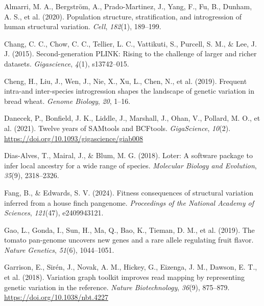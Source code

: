 \documentclass[
]{agujournal2019}
\newlength{\cslhangindent}
\newenvironment{CSLReferences}[2] %
 {\begin{list}{}{%
  \setlength{\itemindent}{0pt}
  \setlength{\leftmargin}{0pt}
  \setlength{\parsep}{0pt}
  \ifodd #1
   \setlength{\leftmargin}{\cslhangindent}
   \setlength{\itemindent}{-1\cslhangindent}
  \fi
  \setlength{\itemsep}{#2\baselineskip}}}
 {\end{list}}
\begin{document}
\label{refs}
\begin{CSLReferences}{1}{0}
\vspace{1em}

Almarri, M. A., Bergström, A., Prado-Martinez, J., Yang, F., Fu, B.,
Dunham, A. S., et al. (2020). Population structure, stratification, and
introgression of human structural variation. \emph{Cell}, \emph{182}(1),
189--199.

Chang, C. C., Chow, C. C., Tellier, L. C., Vattikuti, S., Purcell, S.
M., \& Lee, J. J. (2015). Second-generation PLINK: Rising to the
challenge of larger and richer datasets. \emph{Gigascience},
\emph{4}(1), s13742--015.

Cheng, H., Liu, J., Wen, J., Nie, X., Xu, L., Chen, N., et al. (2019).
Frequent intra-and inter-species introgression shapes the landscape of
genetic variation in bread wheat. \emph{Genome Biology}, \emph{20},
1--16.

Danecek, P., Bonfield, J. K., Liddle, J., Marshall, J., Ohan, V.,
Pollard, M. O., et al. (2021). Twelve years of SAMtools and BCFtools.
\emph{GigaScience}, \emph{10}(2).
\url{https://doi.org/10.1093/gigascience/giab008}

Dias-Alves, T., Mairal, J., \& Blum, M. G. (2018). Loter: A software
package to infer local ancestry for a wide range of species.
\emph{Molecular Biology and Evolution}, \emph{35}(9), 2318--2326.

Fang, B., \& Edwards, S. V. (2024). Fitness consequences of structural
variation inferred from a house finch pangenome. \emph{Proceedings of
the National Academy of Sciences}, \emph{121}(47), e2409943121.

Gao, L., Gonda, I., Sun, H., Ma, Q., Bao, K., Tieman, D. M., et al.
(2019). The tomato pan-genome uncovers new genes and a rare allele
regulating fruit flavor. \emph{Nature Genetics}, \emph{51}(6),
1044--1051.

Garrison, E., Sirén, J., Novak, A. M., Hickey, G., Eizenga, J. M.,
Dawson, E. T., et al. (2018). Variation graph toolkit improves read
mapping by representing genetic variation in the reference. \emph{Nature
Biotechnology}, \emph{36}(9), 875--879.
\url{https://doi.org/10.1038/nbt.4227}


\end{CSLReferences}
\end{document}
